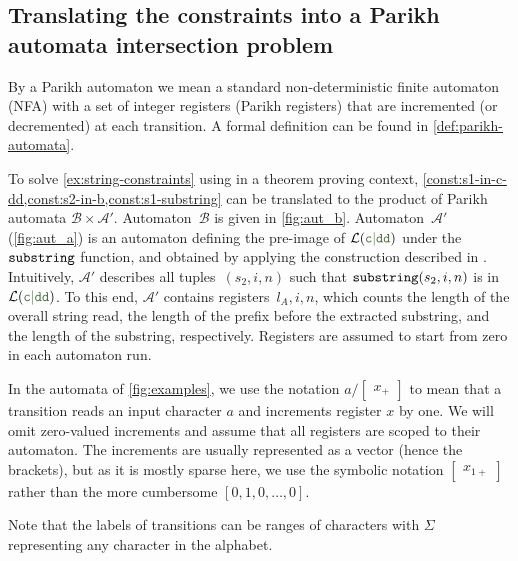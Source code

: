 \subsection{Translating the constraints into a Parikh automata intersection problem}

By a Parikh automaton we mean a standard non-deterministic finite automaton
(NFA) with a set of integer registers (Parikh registers) that are incremented
(or decremented) at each transition. A formal definition can be found in
\cref{def:parikh-automata}.

To solve \cref{ex:string-constraints} using \Calculus{} in a theorem
proving context,
\cref{const:s1-in-c-dd,const:s2-in-b,const:s1-substring} can be
translated to the product of Parikh automata $\mathcal{B} \times
\mathcal{A}'$. Automaton~$\mathcal{B}$ is given in \cref{fig:aut_b}.  Automaton~$\mathcal{A}'$
(\cref{fig:aut_a}) is an automaton defining the pre-image of
$\Language(\Regex{c\RegexOr{}dd})$ under the $\operatorname{\mathtt{substring}}$ function,
and obtained by applying the construction described in
\cite{ostrich-plus}. Intuitively, $\mathcal{A}'$ describes all
tuples~$(s_2, i, n)$ such that $\operatorname{\mathtt{substring}}(s_2, i, n)$ is in
$\Language(\Regex{c\RegexOr{}dd})$. To this end, $\mathcal{A}'$ contains
registers~$l_A, i, n$, which counts the length of the overall string
read, the length of the prefix before the extracted substring, and the
length of the substring, respectively. Registers are assumed to start
from zero in each automaton run.

In the automata of \cref{fig:examples}, we use the notation $a /
\begin{bmatrix} x_+ \end{bmatrix}$ to mean that a transition reads an input
character $a$ and increments register $x$ by one. We will omit zero-valued
increments and assume that all registers are scoped to their automaton. The
increments are usually represented as a vector (hence the brackets), but as it
is mostly sparse here, we use the symbolic notation $\begin{bmatrix} x_{1+}
\end{bmatrix}$ rather than the more cumbersome $\left[ 0, 1,  0 , \ldots, 0
\right]$.

Note that the labels of transitions can be ranges of characters with $\Sigma$
representing any character in the alphabet.

\newcommand{\autscale}[0]{0.48}

